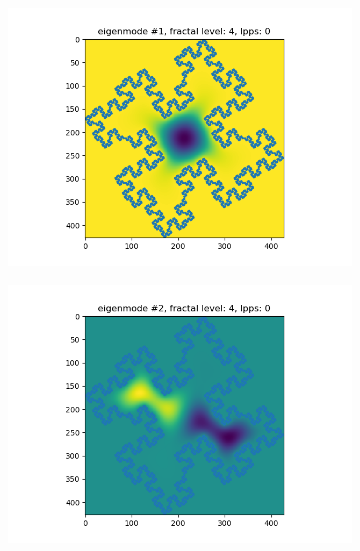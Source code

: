 \documentclass{article}
\begin{document}
\newpage
\begin{figure}
    \begin{subfigure}{0.3\textwidth}
        \includegraphics[width=\linewidth]{../figs/eigenmode_2d1.png}
    \end{subfigure}
    \begin{subfigure}{0.3\textwidth}
        \includegraphics[width=\linewidth]{../figs/eigenmode_2d2.png}
    \end{subfigure}
    \begin{subfigure}{0.3\textwidth}

\end{subfigure}
\end{figure}
\end{document}
